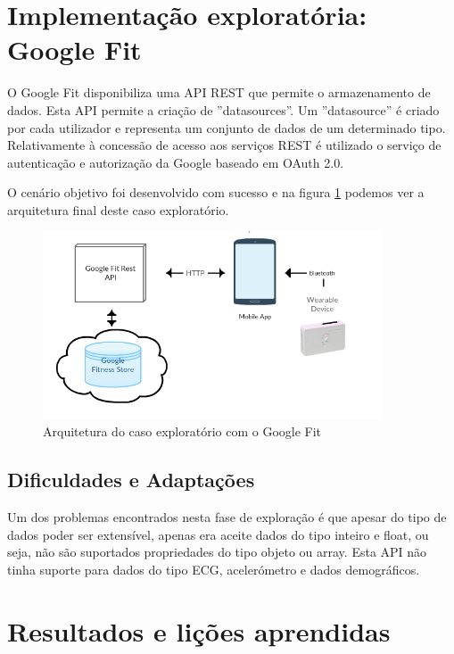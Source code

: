\section{Implementação exploratória: Google Fit}

O Google Fit disponibiliza uma \gls{API} \gls{REST} que permite o armazenamento de dados. Esta \gls{API} permite a criação  de ''datasources''. Um ''datasource'' é criado por cada utilizador e representa  um conjunto de dados de um determinado tipo. Relativamente à concessão de acesso aos serviços \gls{REST} é utilizado o serviço de autenticação e autorização da Google baseado em OAuth 2.0. 
\par
O cenário objetivo foi desenvolvido com sucesso e na figura \ref{f:exp-googlefit-arch} podemos ver a arquitetura final deste caso exploratório.
\begin{figure}[H]
  \centering
  \includegraphics[width=0.9\textwidth]{imgs/googlefit-arch-exp.png}
  \caption[Arquitetura do caso exploratório com o Google Fit]{Arquitetura do caso exploratório com o Google Fit}
  
  \label{f:exp-googlefit-arch}
\end{figure}

\subsection{Dificuldades e Adaptações}

Um dos problemas encontrados nesta fase de exploração é que apesar do tipo de dados poder ser extensível, apenas era aceite dados do tipo inteiro e float, ou seja, não são suportados propriedades do tipo objeto ou array. Esta \gls{API} não tinha suporte para dados do tipo \gls{ECG}, acelerómetro e dados demográficos.

\section{Resultados e lições aprendidas}
